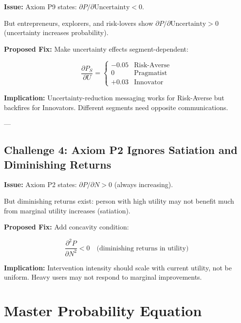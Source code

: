 \documentclass[11pt, a4paper]{article}
\begin{document}
\textbf{Issue:} Axiom P9 states: $\partial P / \partial \text{Uncertainty} < 0$.

But entrepreneurs, explorers, and risk-lovers show $\partial P / \partial \text{Uncertainty} > 0$ (uncertainty increases probability).

\textbf{Proposed Fix:} Make uncertainty effects segment-dependent:

\begin{equation}
\frac{\partial P_S}{\partial U} = \begin{cases} -0.05 & \text{Risk-Averse} \\ 0 & \text{Pragmatist} \\ +0.03 & \text{Innovator} \end{cases}
\end{equation}

\textbf{Implication:} Uncertainty-reduction messaging works for Risk-Averse but backfires for Innovators. Different segments need opposite communications.

---

\subsection{Challenge 4: Axiom P2 Ignores Satiation and Diminishing Returns}

\textbf{Issue:} Axiom P2 states: $\partial P / \partial N > 0$ (always increasing).

But diminishing returns exist: person with high utility may not benefit much from marginal utility increases (satiation).

\textbf{Proposed Fix:} Add concavity condition:

\begin{equation}
\frac{\partial^2 P}{\partial N^2} < 0 \quad \text{(diminishing returns in utility)}
\end{equation}

\textbf{Implication:} Intervention intensity should scale with current utility, not be uniform. Heavy users may not respond to marginal improvements.


\section{Master Probability Equation}
\end{document}
